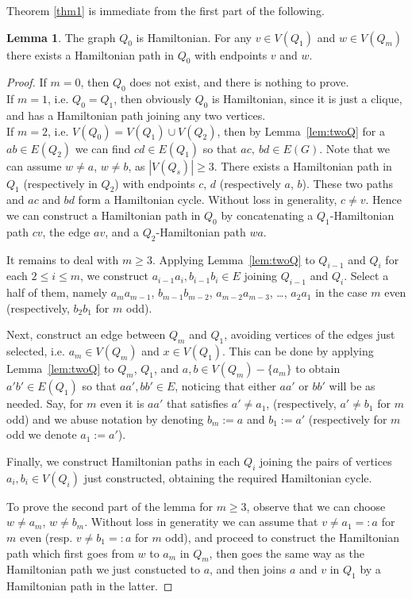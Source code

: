 \documentclass{amsart}
\theoremstyle{definition}
\newtheorem{lemma}{Lemma}
\begin{document}
Theorem \ref{thm1} is immediate from the first part of the following.
\begin{lemma}\label{lem:Q0H}
The graph $Q_0$ is Hamiltonian. 
For any $v\in V(Q_1)$ and $w\in V(Q_m)$ there exists a Hamiltonian
path in $Q_0$ with endpoints $v$ and $w$.
\end{lemma} 
\begin{proof}
If $m=0$, then $Q_0$ does not exist, and there is nothing to prove.\\
If $m=1$, i.e. $Q_0=Q_1$, then obviously $Q_0$ is Hamiltonian, since it is just a clique, and
has a Hamiltonian path joining any two vertices.\\
If $m=2$, i.e. $V(Q_0)=V(Q_1)\cup V(Q_2)$, then by Lemma~\ref{lem:twoQ} 
for a $ab\in E(Q_2)$
we can find $cd\in E(Q_1)$ so that $ac,~bd\in E(G)$. 
Note that we can assume $w\neq a$, $w\neq b$, as $|V(Q_s)|\geq 3$.
There exists a Hamiltonian path in  $Q_1$ (respectively in $Q_2$) 
with endpoints $c$, $d$ (respectively $a$, $b$).
These two paths and $ac$ and $bd$ form a Hamiltonian cycle.
Without loss in generality, $c\neq v$. Hence we can construct a
Hamiltonian path in $Q_0$ by concatenating a $Q_1$-Hamiltonian
path $cv$, the  edge $av$, and a $Q_2$-Hamiltonian path $wa$.
 
It remains to deal with $m\geq 3$.
Applying Lemma~\ref{lem:twoQ} to $Q_{i-1}$ and $Q_i$ for each $2\leq i\leq m$, 
we construct $a_{i-1}a_i, b_{i-1}b_i\in E$ joining $Q_{i-1}$ and $Q_i$.
Select a half of them, namely $a_{m}a_{m-1}$, $b_{m-1}b_{m-2}$, $a_{m-2}a_{m-3}$, \dots,
$a_2a_1$ in the case $m$ even (respectively, $b_2b_1$ for $m$ odd).

Next, construct an edge between $Q_m$ and $Q_1$, avoiding vertices of the edges just
selected, i.e. $a_m\in V(Q_m)$ and $x\in V(Q_1)$. 
This can be done by applying Lemma~\ref{lem:twoQ} to $Q_m$, $Q_1$, 
and $a,b\in V(Q_m)-\{a_m\}$ to obtain $a'b'\in E(Q_1)$ so that $aa',bb'\in E$, 
noticing that either $aa'$ or $bb'$ will be as needed. Say, for $m$ even 
it is $aa'$
that satisfies $a'\neq a_1$, (respectively, $a'\neq b_1$ for $m$ odd)  and we 
abuse notation by denoting $b_m:=a$ and $b_1:=a'$ (respectively for $m$ odd 
we denote $a_1:=a'$).

Finally, we construct Hamiltonian paths in each $Q_i$ joining the pairs of vertices
$a_i,b_i\in V(Q_i)$ just constructed, obtaining the required Hamiltonian cycle.

To prove the second part of the lemma for $m\geq 3$, observe that we can choose
$w\neq a_m$, $w\neq b_m$. Without loss in generatity we can assume that $v\neq a_1=:a$ 
for $m$ even (resp. $v\neq b_1=:a$ for $m$ odd), 
and proceed to construct the Hamiltonian path
which first goes from $w$ to $a_m$ in $Q_m$, then goes the same way as the Hamiltonian
path we just constucted to $a$, and then joins $a$ and $v$ in $Q_1$ by a Hamiltonian path 
in the latter.
\end{proof}
\end{document}
